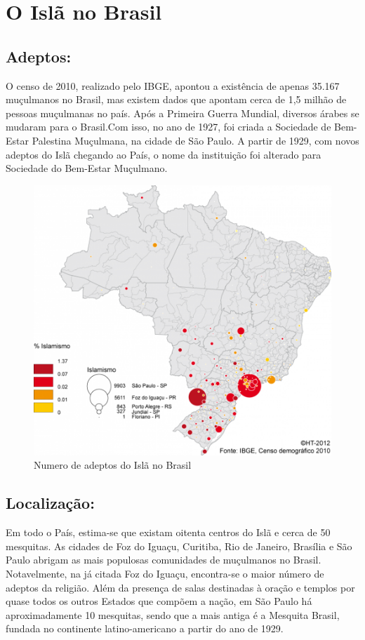 \documentclass[12pt]{article}
\begin{document}
\section{O Islã no Brasil}
\subsection{Adeptos:}
O censo de 2010, realizado pelo IBGE, apontou a existência de apenas 35.167 muçulmanos no Brasil, mas existem dados que apontam cerca de 1,5 milhão de pessoas muçulmanas no país.
Após a Primeira Guerra Mundial, diversos árabes se mudaram para o Brasil.Com isso, no ano de 1927, foi criada a Sociedade de Bem-Estar Palestina Muçulmana, na cidade de São Paulo. A partir de 1929, com novos adeptos do Islã chegando ao País, o nome da instituição foi alterado para Sociedade do Bem-Estar Muçulmano.

\begin{figure}[ht]
    \setlength{\abovecaptionskip}{5pt}
    \setlength{\belowcaptionskip}{0pt}
    \caption[Numero de adeptos do Islã no Brasil]
        {Numero de adeptos do Islã no Brasil}
    \centering
    \includegraphics[width=.80\textwidth]{brasil_isla.png}
    \captionsetup[grafico]{justification=centering}
    \end{figure}

\subsection{Localização:}
 Em todo o País, estima-se que existam oitenta centros do Islã e cerca de 50 mesquitas. As cidades de Foz do Iguaçu, Curitiba, Rio de Janeiro, Brasília e São Paulo abrigam as mais populosas comunidades de muçulmanos no Brasil. Notavelmente, na já citada Foz do Iguaçu, encontra-se o maior número de adeptos da religião. Além da presença de salas destinadas à oração e templos por quase todos os outros Estados que compõem a nação, em São Paulo há aproximadamente 10 mesquitas, sendo que a mais antiga é a Mesquita Brasil, fundada no continente latino-americano a partir do ano de 1929.
\end{document}
